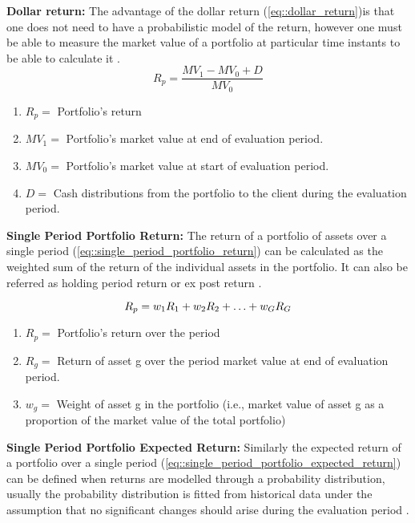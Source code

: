 \textbf{Dollar return:} The advantage of the dollar return (\ref{eq::dollar_return})is that one does not need to have a probabilistic model of the return, however one must be able to measure the market value of a portfolio at particular time instants to be able to calculate it \cite{investment_management_book_2010}.
\begin{equation}
    \label{eq::dollar_return}
    R_p = \frac{MV_1 - MV_0 + D}{MV_0}
\end{equation}
\begin{enumerate}
    \item $R_p = $ Portfolio's return
    \item $MV_1 = $ Portfolio's market value at end of evaluation period.
    \item $MV_0 = $ Portfolio's market value at start of evaluation period.
    \item $D = $ Cash distributions from the portfolio to the client during the evaluation period.
\end{enumerate}

\textbf{Single Period Portfolio Return:} The return of a portfolio of assets over a single period (\ref{eq::single_period_portfolio_return}) can be calculated as the weighted sum of the return of the individual assets in the portfolio. It can also be referred as holding period return or ex post return \cite{investment_management_book_2010}.

\begin{equation}
    \label{eq::single_period_portfolio_return}
    R_p = w_1R_1+w_2R_2+\mathellipsis+w_GR_G
\end{equation}
\begin{enumerate}
    \item $R_p = $ Portfolio's return over the period
    \item $R_g = $ Return of asset g over the period market value at end of evaluation period.
    \item $w_g = $ Weight of asset g in the portfolio (i.e., market value of asset g as a proportion of the market value of the total portfolio)
\end{enumerate}

\textbf{Single Period Portfolio Expected Return:} Similarly the expected return of a portfolio over a single period (\ref{eq::single_period_portfolio_expected_return}) can be defined when returns are modelled through a probability distribution, usually the probability distribution is fitted from  historical data under the assumption that no significant changes should arise during the evaluation period \cite{investment_management_book_2010}.

